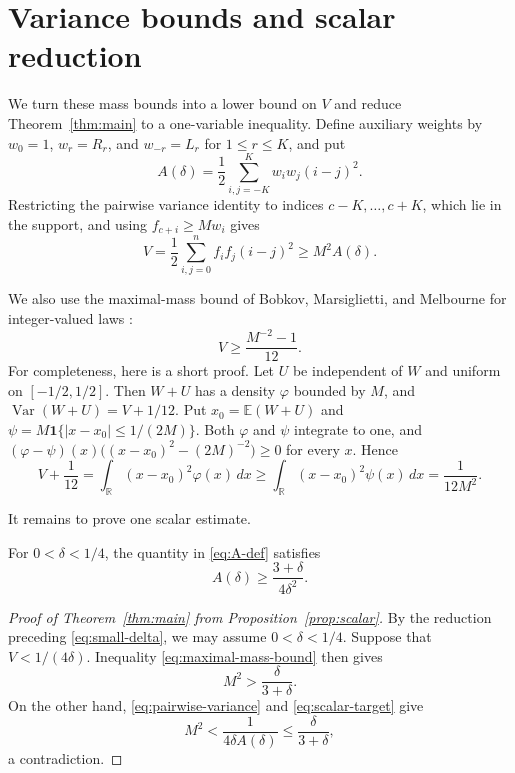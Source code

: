 \documentclass[ECP,preprint]{ejpecp}
\newcommand{\Var}{\operatorname{Var}}
\begin{document}
\section{Variance bounds and scalar reduction}
\label{sec:variance}

We turn these mass bounds into a lower bound on $V$ and reduce
Theorem~\ref{thm:main} to a one-variable inequality. Define auxiliary weights by $w_0=1$, $w_r=R_r$, and $w_{-r}=L_r$ for
$1\leq r\leq K$, and put
\begin{equation}\label{eq:A-def}
  A(\delta)=\frac12\sum_{i,j=-K}^K w_iw_j(i-j)^2.
\end{equation}
Restricting the pairwise variance identity to indices $c-K,\ldots,c+K$, which
lie in the support, and using $f_{c+i}\geq Mw_i$ gives
\begin{equation}\label{eq:pairwise-variance}
  V=\frac12\sum_{i,j=0}^n f_if_j(i-j)^2
  \geq M^2A(\delta).
\end{equation}

We also use the maximal-mass bound of Bobkov, Marsiglietti, and Melbourne
for integer-valued laws
\cite[Corollary~3.2]{bobkovmarsigliettimelbourne2022}:
\begin{equation}\label{eq:maximal-mass-bound}
  V\geq\frac{M^{-2}-1}{12}.
\end{equation}
For completeness, here is a short proof. Let $U$ be independent of $W$ and
uniform on $[-1/2,1/2]$. Then $W+U$ has a density $\varphi$ bounded by $M$,
and $\Var(W+U)=V+1/12$. Put $x_0=\mathbb E(W+U)$ and
$\psi=M\mathbf 1\{|x-x_0|\leq1/(2M)\}$. Both $\varphi$ and $\psi$ integrate
to one, and $(\varphi-\psi)(x)\bigl((x-x_0)^2-(2M)^{-2}\bigr)\geq0$ for
every $x$. Hence
\[
  V+\frac1{12}
  =\int_{\mathbb R}(x-x_0)^2\varphi(x)\,dx
  \geq\int_{\mathbb R}(x-x_0)^2\psi(x)\,dx
  =\frac1{12M^2}.
\]

It remains to prove one scalar estimate.

\begin{proposition}\label{prop:scalar}
  For $0<\delta<1/4$, the quantity in \eqref{eq:A-def} satisfies
  \begin{equation}\label{eq:scalar-target}
    A(\delta)\geq\frac{3+\delta}{4\delta^2}.
  \end{equation}
\end{proposition}

\begin{proof}[Proof of Theorem~\ref{thm:main} from
  Proposition~\ref{prop:scalar}]
  By the reduction preceding \eqref{eq:small-delta}, we may assume
  $0<\delta<1/4$. Suppose that
  $V<1/(4\delta)$. Inequality \eqref{eq:maximal-mass-bound} then gives
  \[
    M^2>\frac{\delta}{3+\delta}.
  \]
  On the other hand, \eqref{eq:pairwise-variance} and
  \eqref{eq:scalar-target} give
  \[
    M^2<\frac1{4\delta A(\delta)}
    \leq\frac{\delta}{3+\delta},
  \]
  a contradiction.
\end{proof}
\end{document}
